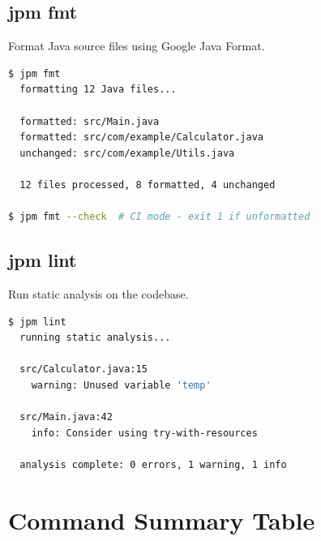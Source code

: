 \documentclass[12pt,a4paper]{report}
\begin{document}
\subsection{jpm fmt}

Format Java source files using Google Java Format.

\begin{lstlisting}[language=bash, caption=Code Formatting]
$ jpm fmt
  formatting 12 Java files...
  
  formatted: src/Main.java
  formatted: src/com/example/Calculator.java
  unchanged: src/com/example/Utils.java
  
  12 files processed, 8 formatted, 4 unchanged

$ jpm fmt --check  # CI mode - exit 1 if unformatted
\end{lstlisting}

\subsection{jpm lint}

Run static analysis on the codebase.

\begin{lstlisting}[language=bash, caption=Static Analysis]
$ jpm lint
  running static analysis...
  
  src/Calculator.java:15
    warning: Unused variable 'temp'
  
  src/Main.java:42
    info: Consider using try-with-resources
  
  analysis complete: 0 errors, 1 warning, 1 info
\end{lstlisting}

\section{Command Summary Table}
\end{document}
